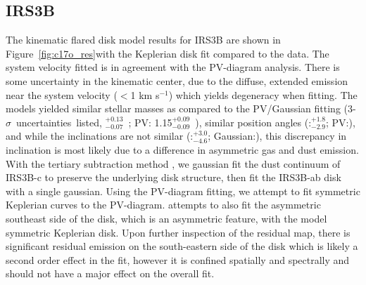 \subsection{IRS3B}
The \pdspy\space kinematic flared disk model results for IRS3B are shown in Figure~\ref{fig:c17o_res}\space with the Keplerian disk fit compared to the data. The system velocity fitted is in agreement with the PV-diagram analysis. There is some uncertainty in the kinematic center, due to the diffuse, extended emission near the system velocity ($<$1 km s$^{-1}$) which yields degeneracy when fitting. The models yielded similar stellar masses as compared to the PV/Gaussian fitting (3-$\sigma$~uncertainties~listed, \pdspy{}$^{+0.13}_{-0.07}$~\solm; PV: 1.15$^{+0.09}_{-0.09}$~\solm), similar position angles (\pdspy:\deg$^{+  1.8}_{-  2.9}$; PV:\deg), and while the inclinations are not similar (\pdspy:\deg$^{+ 3.0}_{- 4.6}$; Gaussian:\deg), this discrepancy in inclination is most likely due to a difference in asymmetric gas and dust emission. With the tertiary subtraction method%
, we gaussian fit the dust continuum of IRS3B-c to preserve the underlying disk structure, then fit the IRS3B-ab disk with a single gaussian. Using the PV-diagram fitting, we attempt to fit symmetric Keplerian curves to the PV-diagram. \pdspy\space attempts to also fit the asymmetric southeast side of the disk, which is an asymmetric feature, with the model symmetric Keplerian disk. Upon further inspection of the residual map, there is significant residual emission on the south-eastern side of the disk which is likely a second order effect in the fit, however it is confined spatially and spectrally and should not have a major effect on the overall fit.

